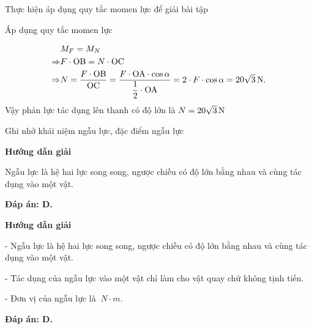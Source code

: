 \begin{dang}{Thực hiện áp dụng quy tắc momen lực để giải bài tập}
{		Áp dụng quy tắc momen lực
		
		\begin{align*}
			&M_F=M_N\\
			\Rightarrow& F\cdot \textrm{OB} = N\cdot \textrm{OC}\\
			\Rightarrow& N  = \dfrac{F\cdot \textrm{OB}}{\textrm{OC}}
			=
			\dfrac{F\cdot \textrm{OA}\cdot \cos\alpha}{\dfrac{1}{2}\cdot \textrm{OA}}
			=2\cdot F\cdot \cos\alpha = \SI[parse-numbers=false]{20\sqrt{3}}{N}.
		\end{align*}
		Vậy phản lực tác dụng lên thanh có độ lớn là $N=\SI[parse-numbers=false]{20\sqrt{3}}{N}$
		
	}
	
\end{dang}
\begin{dang}{Ghi nhớ khái niệm ngẫu lực, đặc điểm ngẫu lực}
	{	\begin{center}
			\textbf{Hướng dẫn giải}
		\end{center}
		
		Ngẫu lực là hệ hai lực song song, ngược chiều có độ lớn bằng nhau và cùng tác dụng vào một vật.
		
		\textbf{Đáp án: D.}
	}
	{	\begin{center}
			\textbf{Hướng dẫn giải}
		\end{center}
		
		- Ngẫu lực là hệ hai lực song song, ngược chiều có độ lớn bằng nhau và cùng tác dụng vào một vật.
		
		- Tác dụng của ngẫu lực vào một vật chỉ làm cho vật quay chứ không tịnh tiến.
		
		- Đơn vị của ngẫu lực là $\SI{}{N\cdot m}$.
		
		\textbf{Đáp án: D.}
	}
\end{dang}
